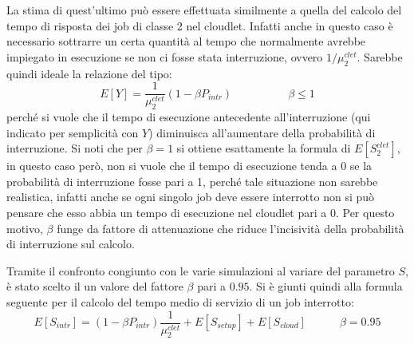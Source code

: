 La stima di quest'ultimo può essere effettuata similmente a quella del calcolo
del tempo di risposta dei job di classe 2 nel cloudlet. Infatti anche in questo
caso è necessario sottrarre un certa quantità al tempo che normalmente avrebbe
impiegato in esecuzione se non ci fosse stata interruzione, ovvero
$1/\mu_2^{clet}$. Sarebbe quindi ideale la relazione del tipo:
\begin{displaymath}
E[Y] = \frac{1}{\mu_2^{clet}}(1 - \beta P_{intr})
\qquad\quad\qquad \beta \leq 1
\end{displaymath}
perché si vuole che il tempo di esecuzione antecedente all'interruzione (qui
indicato per semplicità con $Y$) diminuisca all'aumentare della probabilità di
interruzione. Si noti che per $\beta = 1$ si ottiene esattamente la formula di
$E[S_2^{clet}]$, in questo caso però, non si vuole che il tempo di esecuzione
tenda a 0 se la probabilità di interruzione fosse pari a 1, perché tale
situazione non sarebbe realistica, infatti anche se ogni singolo job deve essere
interrotto non si può pensare che esso abbia un tempo di esecuzione nel cloudlet
pari a 0. Per questo motivo, $\beta$ funge da fattore di attenuazione che riduce
l'incisività della probabilità di interruzione sul calcolo.

Tramite il confronto congiunto con le varie simulazioni al variare del parametro
$S$, è stato scelto il un valore del fattore $\beta$ pari a $0.95$. Si è giunti
quindi alla formula seguente per il calcolo del tempo medio di servizio di un
job interrotto:
\begin{equation}
E[S_{intr}] = 
(1 - \beta P_{intr}) \frac{1}{\mu_2^{clet}} + E[S_{setup}] + E[S_{cloud}]
\qquad\quad \beta = 0.95
\end{equation}

